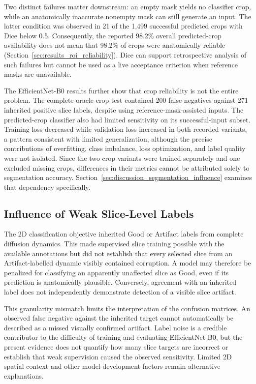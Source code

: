 Two distinct failures matter downstream: an empty mask yields no classifier crop, while an anatomically inaccurate nonempty mask can still generate an input. The latter condition was observed in 21 of the 1,499 successful predicted crops with Dice below 0.5. Consequently, the reported 98.2\% overall predicted-crop availability does not mean that 98.2\% of crops were anatomically reliable (Section~\ref{sec:results_roi_reliability}). Dice can support retrospective analysis of such failures but cannot be used as a live acceptance criterion when reference masks are unavailable.

The EfficientNet-B0 results further show that crop reliability is not the entire problem. The complete oracle-crop test contained 200 false negatives against 271 inherited positive slice labels, despite using reference-mask-assisted inputs. The predicted-crop classifier also had limited sensitivity on its successful-input subset. Training loss decreased while validation loss increased in both recorded variants, a pattern consistent with limited generalization, although the precise contributions of overfitting, class imbalance, loss optimization, and label quality were not isolated. Since the two crop variants were trained separately and one excluded missing crops, differences in their metrics cannot be attributed solely to segmentation accuracy. Section~\ref{sec:discussion_segmentation_influence} examines that dependency specifically.

\subsection{Influence of Weak Slice-Level Labels}
\label{subsec:discussion_2d_weak_labels}

The 2D classification objective inherited Good or Artifact labels from complete diffusion dynamics. This made supervised slice training possible with the available annotations but did not establish that every selected slice from an Artifact-labelled dynamic visibly contained corruption. A model may therefore be penalized for classifying an apparently unaffected slice as Good, even if its prediction is anatomically plausible. Conversely, agreement with an inherited label does not independently demonstrate detection of a visible slice artifact.

This granularity mismatch limits the interpretation of the confusion matrices. An observed false negative against the inherited target cannot automatically be described as a missed visually confirmed artifact. Label noise is a credible contributor to the difficulty of training and evaluating EfficientNet-B0, but the present evidence does not quantify how many slice targets are incorrect or establish that weak supervision caused the observed sensitivity. Limited 2D spatial context and other model-development factors remain alternative explanations.

